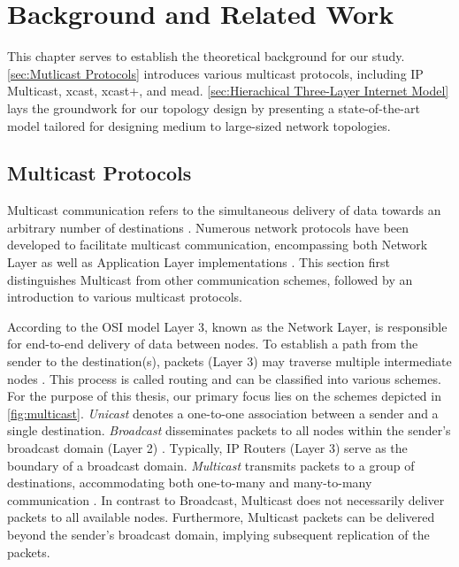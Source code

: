 \chapter{Background and Related Work} %
\label{chap:Background and Work}
This chapter serves to establish the theoretical background for our study.
\autoref{sec:Mutlicast Protocols} introduces various multicast protocols,
    including IP Multicast, \gls{xcast}, \gls{xcast+}, and \gls{mead}.
\autoref{sec:Hierachical Three-Layer Internet Model} lays the groundwork
    for our topology design by presenting a state-of-the-art model tailored for
    designing medium to large-sized network topologies.

\section{Multicast Protocols} %
\label{sec:Mutlicast Protocols}
Multicast communication refers to the simultaneous delivery of data towards an
    arbitrary number of destinations
    \cite{mc_routing_multimedia, mc_comm_multicomputer}.
Numerous network protocols have been developed to facilitate multicast
communication, encompassing both Network Layer as well as Application Layer
    implementations \cite{universal_mc, overlay_mc_routing}.
This section first distinguishes Multicast from other communication schemes,
    followed by an introduction to various multicast protocols.

According to the OSI model \cite{osi1980} Layer 3, known as the Network Layer,
    is responsible for end-to-end delivery of data between nodes.
To establish a path from the sender to the destination(s), packets (Layer 3)
    may traverse multiple intermediate nodes \cite{rfc791_ip}.
This process is called routing and can be classified into various schemes.
For the purpose of this thesis, our primary focus lies on the schemes depicted
    in \autoref{fig:multicast}.
\textit{Unicast} denotes a one-to-one association between a sender and a single
    destination.
\textit{Broadcast} disseminates packets to all nodes within the sender's
    broadcast domain (Layer 2) \cite{broadcast}.
Typically, IP Routers (Layer 3) serve as the boundary of a broadcast domain.
\textit{Multicast} transmits packets to a group of destinations, accommodating
    both one-to-many and many-to-many communication \cite{rfc1112_ip4mc}.
In contrast to Broadcast, Multicast does not necessarily deliver packets to all
    available nodes.
Furthermore, Multicast packets can be delivered beyond the sender's broadcast 
    domain, implying subsequent replication of the packets.

